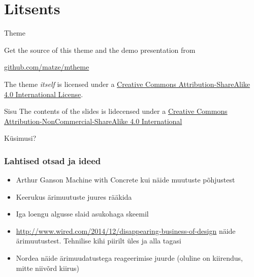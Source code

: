 \section{Litsents}
\begin{frame}{Theme}

  Get the source of this theme and the demo presentation from

  \begin{center}\url{github.com/matze/mtheme}\end{center}

  The theme \emph{itself} is licensed under a
  \href{http://creativecommons.org/licenses/by-sa/4.0/}{Creative Commons
  Attribution-ShareAlike 4.0 International License}.

  \begin{center}\ccbysa\end{center}

\end{frame}

\begin{frame}{Sisu}
	The contents of the slides is lidecensed under a \href{http://creativecommons.org/licenses/by-nc-sa/4.0/}{Creative Commons Attribution-NonCommercial-ShareAlike 4.0 International}
	\begin{center}\ccbyncsa\end{center}
\end{frame}

\begin{frame}[plain]
	\begin{center}Küsimusi?\end{center}
\end{frame}


\begin{frame}[fragile]
  \frametitle{Lahtised otsad ja ideed}
	\begin{itemize}
		\item Arthur Ganson Machine with Concrete kui näide muutuste põhjustest
		\item Keerukus ärimuutuste juures rääkida
		\item Iga loengu algusse slaid asukohaga skeemil
		\item \url{http://www.wired.com/2014/12/disappearing-business-of-design} näide ärimuutustest. Tehnilise kihi piirilt üles ja alla tagasi
		\item Nordea näide ärimuudatustega reageerimise juurde (oluline on kiirendus, mitte niivõrd kiirus)
	\end{itemize}
\end{frame}


